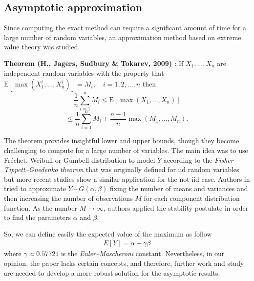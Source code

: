 \subsection{Asymptotic approximation}
Since computing the exact method can require a significant amount of time for a large number of random variables, an approximation method based on extreme value theory was studied.

\textbf{Theorem (H., Jagers, Sudbury \& Tokarev, 2009) \cite{hamza2009mixing}}: If \( X_1, \ldots, X_n \) are independent random variables with the property that  $\mathrm{E}[\max(X_1^i, \ldots, X_n^i)] = M_i, \quad i = 1, 2, \ldots, n$ then 
\[
\frac{1}{n} \sum_{i=1}^n M_i \leq \mathrm{E}[\max(X_1, \ldots, X_n)]
\]
\[
\leq \frac{1}{n} \sum_{i=1}^n M_i + \frac{n-1}{n} \max(M_1, \ldots, M_n).
\]

The theorem provides insightful lower and upper bounds, though they become challenging to compute for a large number of variables. The main idea was to use Fréchet, Weibull or Gumbell distribution to model $Y$ according to the \textit{Fisher–Tippett–Gnedenko theorem} \cite{fisher1928limiting} that was originally defined for iid random variables but more recent studies show a similar application for the not iid case. Authors in \cite{padua2013distribution} tried to approximate $Y \dot \sim \ G(\alpha, \beta)$ fixing the number of means and variances and then increasing the number of observations $M$ for each component distribution function. As the number $M \rightarrow \infty$, authors applied the stability postulate in order to find the parameters $\alpha$ and $\beta$.




So, we can define easily the expected value of the maximum as follow
\begin{align*}
	E[Y] = \alpha + \gamma \beta
\end{align*}
where $\gamma \approx 0.57721$ is the \textit{Euler–Mascheroni} constant. Nevertheless, in our opinion, the paper lacks certain concepts, and therefore, further work and study are needed to develop a more robust solution for the asymptotic results.
